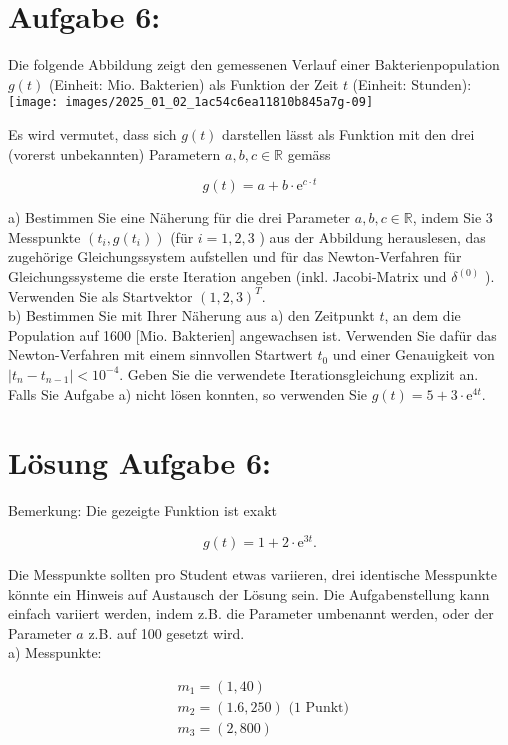\documentclass[10pt]{article}
\begin{document}
\section*{Aufgabe 6:}
Die folgende Abbildung zeigt den gemessenen Verlauf einer Bakterienpopulation $g(t)$ (Einheit: Mio. Bakterien) als Funktion der Zeit $t$ (Einheit: Stunden):\\
\texttt{[image: images/2025\_01\_02\_1ac54c6ea11810b845a7g-09]}

Es wird vermutet, dass sich $g(t)$ darstellen lässt als Funktion mit den drei (vorerst unbekannten) Parametern $a, b, c \in \mathbb{R}$ gemäss

$$
g(t)=a+b \cdot \mathrm{e}^{c \cdot t}
$$

a) Bestimmen Sie eine Näherung für die drei Parameter $a, b, c \in \mathbb{R}$, indem Sie 3 Messpunkte $\left(t_{i}, g\left(t_{i}\right)\right)$ (für $i=1,2,3$ ) aus der Abbildung herauslesen, das zugehörige Gleichungssystem aufstellen und für das Newton-Verfahren für Gleichungssysteme die erste Iteration angeben (inkl. Jacobi-Matrix und $\delta^{(0)}$ ). Verwenden Sie als Startvektor $(1,2,3)^{T}$.\\
b) Bestimmen Sie mit Ihrer Näherung aus a) den Zeitpunkt $t$, an dem die Population auf 1600 [Mio. Bakterien] angewachsen ist. Verwenden Sie dafür das Newton-Verfahren mit einem sinnvollen Startwert $t_{0}$ und einer Genauigkeit von $\left|t_{n}-t_{n-1}\right|<10^{-4}$. Geben Sie die verwendete Iterationsgleichung explizit an.\\
Falls Sie Aufgabe a) nicht lösen konnten, so verwenden Sie $g(t)=5+3 \cdot \mathrm{e}^{4 t}$.

\section*{Lösung Aufgabe 6:}
Bemerkung: Die gezeigte Funktion ist exakt

$$
g(t)=1+2 \cdot \mathrm{e}^{3 t} .
$$

Die Messpunkte sollten pro Student etwas variieren, drei identische Messpunkte könnte ein Hinweis auf Austausch der Lösung sein. Die Aufgabenstellung kann einfach variiert werden, indem z.B. die Parameter umbenannt werden, oder der Parameter $a$ z.B. auf 100 gesetzt wird.\\
a) Messpunkte:

$$
\begin{aligned}
& m_{1}=(1,40) \\
& m_{2}=(1.6,250) \text { (1 Punkt) } \\
& m_{3}=(2,800)
\end{aligned}
$$
\end{document}
